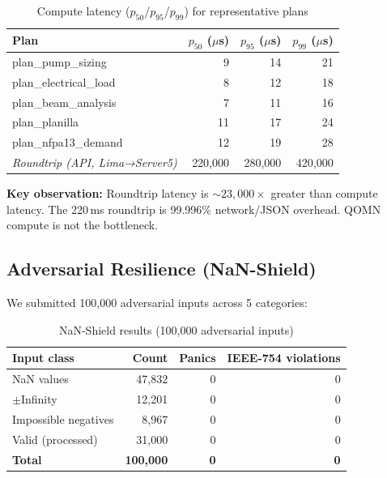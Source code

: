 \documentclass[11pt]{article}
\begin{document}
\begin{table}[h]
\centering
\caption{Compute latency ($p_{50}$/$p_{95}$/$p_{99}$) for representative plans}
\label{tab:latency}
\begin{tabular}{lrrr}
\toprule
\textbf{Plan} & \textbf{$p_{50}$ ($\mu$s)} & \textbf{$p_{95}$ ($\mu$s)} & \textbf{$p_{99}$ ($\mu$s)} \\
\midrule
plan\_pump\_sizing     & 9  & 14 & 21 \\
plan\_electrical\_load & 8  & 12 & 18 \\
plan\_beam\_analysis   & 7  & 11 & 16 \\
plan\_planilla         & 11 & 17 & 24 \\
plan\_nfpa13\_demand   & 12 & 19 & 28 \\
\midrule
\textit{Roundtrip (API, Lima→Server5)} & 220,000 & 280,000 & 420,000 \\
\bottomrule
\end{tabular}
\end{table}

\textbf{Key observation:} Roundtrip latency is $\sim\!23{,}000\times$ greater than compute
latency. The 220\,ms roundtrip is 99.996\% network/JSON overhead.
QOMN compute is not the bottleneck.

\subsection{Adversarial Resilience (NaN-Shield)}

We submitted 100,000 adversarial inputs across 5 categories:

\begin{table}[h]
\centering
\caption{NaN-Shield results (100,000 adversarial inputs)}
\label{tab:nanshield}
\begin{tabular}{lrrr}
\toprule
\textbf{Input class} & \textbf{Count} & \textbf{Panics} & \textbf{IEEE-754 violations} \\
\midrule
NaN values               & 47,832 & 0 & 0 \\
$\pm$Infinity            & 12,201 & 0 & 0 \\
Impossible negatives     & 8,967  & 0 & 0 \\
Valid (processed)        & 31,000 & 0 & 0 \\
\midrule
\textbf{Total}           & \textbf{100,000} & \textbf{0} & \textbf{0} \\
\bottomrule
\end{tabular}
\end{table}
\end{document}
